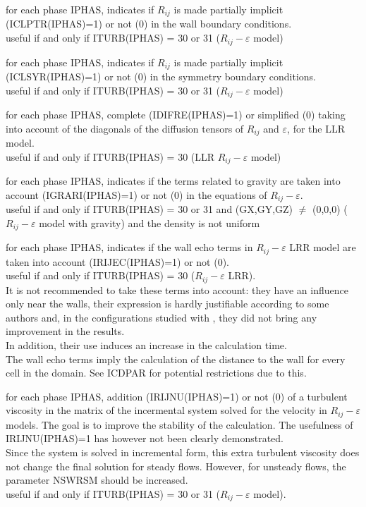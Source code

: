 
{for each phase IPHAS, indicates if $R_{ij}$ is made partially implicit
(ICLPTR(IPHAS)=1) or not (0) in the wall boundary conditions.\\
useful if and only if ITURB(IPHAS) = 30 or 31 ($R_{ij}-\varepsilon$ model)}

{for each phase IPHAS, indicates if $R_{ij}$ is made partially implicit
(ICLSYR(IPHAS)=1) or not (0) in the symmetry boundary conditions.\\
useful if and only if ITURB(IPHAS) = 30 or 31 ($R_{ij}-\varepsilon$ model)}

{for each phase IPHAS, complete (IDIFRE(IPHAS)=1) or simplified (0)
taking into account of the diagonals of the diffusion tensors of $R_{ij}$
and $\varepsilon$, for the LLR model.\\
useful if and only if ITURB(IPHAS) = 30 (LLR $R_{ij}-\varepsilon$ model)}

{for each phase IPHAS, indicates if the terms related to gravity are
taken into account (IGRARI(IPHAS)=1) or not (0) in the equations of
$R_{ij}-\varepsilon$. \\
useful if and only if ITURB(IPHAS) = 30 or 31 and (GX,GY,GZ) $\ne$
(0,0,0) ($R_{ij}-\varepsilon$ model with gravity) and the density is not uniform}

{for each phase IPHAS, indicates if the wall echo terms in
$R_{ij}-\varepsilon$ LRR model are
taken into account (IRIJEC(IPHAS)=1) or not (0).\\
useful if and only if ITURB(IPHAS) = 30 ($R_{ij}-\varepsilon$ LRR).\\
It is not recommended to take these terms into account:
they have an influence only near the walls, their expression is hardly
justifiable according to some authors and, in the configurations
studied with \CS, they did not bring any improvement in the results.\\
In addition, their use induces an increase in the calculation
time.\\
The wall echo terms imply the calculation of the distance to the wall
for every cell in the domain. See ICDPAR for potential restrictions due
to this.}

{for each phase IPHAS, addition (IRIJNU(IPHAS)=1) or not (0) of a
turbulent viscosity in the matrix of the incermental system solved
for the velocity in $R_{ij}-\varepsilon$ models. The goal is to improve
the stability of the calculation. The usefulness of IRIJNU(IPHAS)=1 has
however not been clearly demonstrated.\\
Since the system is solved in incremental form, this extra turbulent
viscosity does not change the final solution for steady flows. However,
for unsteady flows, the parameter NSWRSM should be increased.\\
useful if and only if ITURB(IPHAS) = 30 or 31 ($R_{ij}-\varepsilon$ model).}

